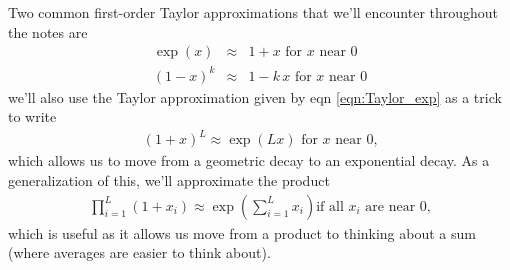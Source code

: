 Two common first-order Taylor approximations that we'll encounter
throughout the notes are
\begin{eqnarray}
\exp(x)&\approx &1+x \mbox{ for $x$ near $0$}  \label{eqn:Taylor_exp}\\
(1-x)^k &\approx & 1-k\,x \mbox{ for $x$ near $0$}
\end{eqnarray}
 we'll also use the Taylor approximation given by eqn
 \eqref{eqn:Taylor_exp} as a trick to write
\begin{eqnarray}
     (1+x)^L \approx  \exp\left( L x\right)  \mbox{ for $x$ near $0$,} \label{eqn:Taylor_geo} 
\end{eqnarray}
which allows
 us to move from a geometric decay to an exponential decay. As a
 generalization of this, we'll approximate the product 
 \begin{eqnarray}
   \prod_{i=1}^L (1+x_i) \approx  \exp\left( \sum_{i=1}^L x_i\right)
                                   \mbox{if all $x_i$ are near $0$,} \label{eqn:Taylor_prod} 
 \end{eqnarray}  
which is useful as it allows us move from a product to thinking about
a sum (where averages are easier to think about). 

